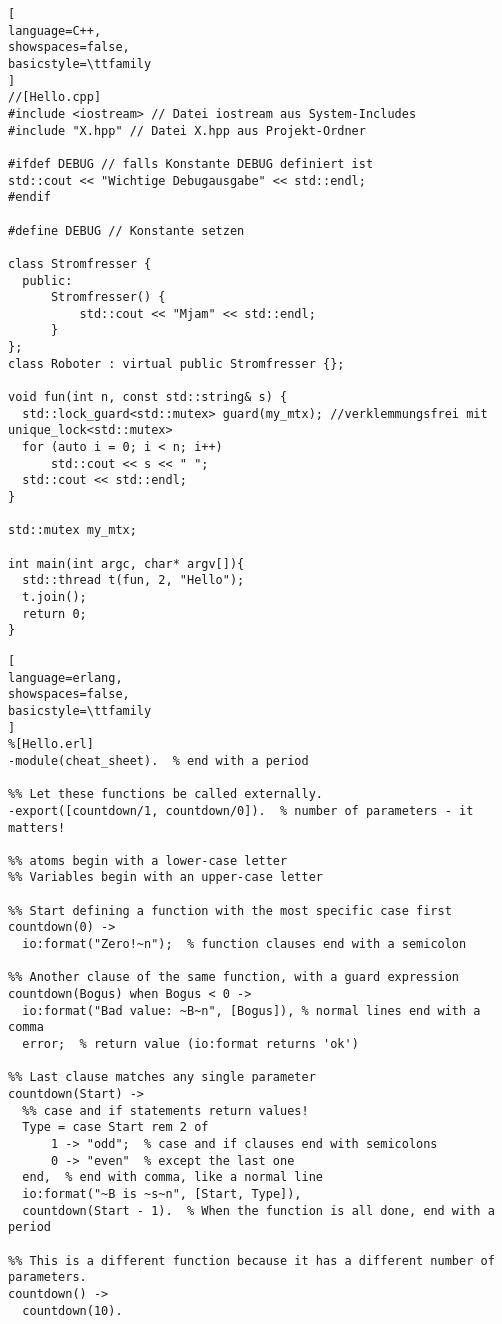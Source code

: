 \documentclass[10pt]{article}
\begin{document}
\begin{lstlisting}[
language=C++,
showspaces=false,
basicstyle=\ttfamily
]
//[Hello.cpp]
#include <iostream> // Datei iostream aus System-Includes
#include "X.hpp" // Datei X.hpp aus Projekt-Ordner

#ifdef DEBUG // falls Konstante DEBUG definiert ist
std::cout << "Wichtige Debugausgabe" << std::endl;
#endif

#define DEBUG // Konstante setzen

class Stromfresser {
  public:
      Stromfresser() {
          std::cout << "Mjam" << std::endl;
      }
};
class Roboter : virtual public Stromfresser {};

void fun(int n, const std::string& s) {
  std::lock_guard<std::mutex> guard(my_mtx); //verklemmungsfrei mit unique_lock<std::mutex>
  for (auto i = 0; i < n; i++)
      std::cout << s << " ";
  std::cout << std::endl;
}

std::mutex my_mtx;

int main(int argc, char* argv[]){
  std::thread t(fun, 2, "Hello");
  t.join();
  return 0;
}
\end{lstlisting}
\hfill

\begin{lstlisting}[
language=erlang,
showspaces=false,
basicstyle=\ttfamily
]
%[Hello.erl]
-module(cheat_sheet).  % end with a period

%% Let these functions be called externally.
-export([countdown/1, countdown/0]).  % number of parameters - it matters!

%% atoms begin with a lower-case letter
%% Variables begin with an upper-case letter

%% Start defining a function with the most specific case first
countdown(0) ->  
  io:format("Zero!~n");  % function clauses end with a semicolon

%% Another clause of the same function, with a guard expression
countdown(Bogus) when Bogus < 0 ->
  io:format("Bad value: ~B~n", [Bogus]), % normal lines end with a comma
  error;  % return value (io:format returns 'ok')
  
%% Last clause matches any single parameter
countdown(Start) ->
  %% case and if statements return values!
  Type = case Start rem 2 of
      1 -> "odd";  % case and if clauses end with semicolons
      0 -> "even"  % except the last one
  end,  % end with comma, like a normal line
  io:format("~B is ~s~n", [Start, Type]), 
  countdown(Start - 1).  % When the function is all done, end with a period

%% This is a different function because it has a different number of parameters.
countdown() ->
  countdown(10).

\end{lstlisting}
\hfill
\end{document}
